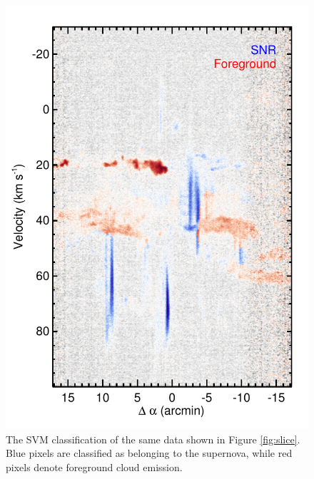 \begin{figure}
\includegraphics{slice_class}
\caption{The SVM classification of the same data shown in Figure \ref{fig:slice}. Blue pixels are classified as belonging to the supernova, while red pixels denote foreground cloud emission.}
\label{fig:slice_class}
\end{figure}


